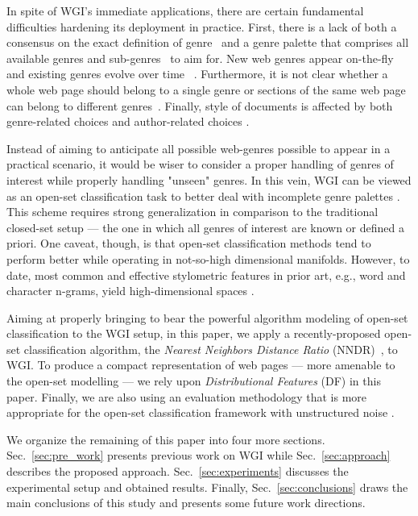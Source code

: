 \documentclass{llncs}
\begin{document}
In spite of WGI's immediate applications, there are certain fundamental difficulties hardening its deployment in practice. First, there is a lack of both a consensus on the exact definition of genre~\cite{crowston2011problems} and a genre palette that comprises all available genres and sub-genres~\cite{santini2011cross,mehler2010genres_on_web,mason2009n,sharoff2010web} to aim for. New web genres appear on-the-fly and existing genres evolve over time~ \cite{Boese2005}. Furthermore, it is not clear whether a whole web page should belong to a single genre or sections of the same web page can belong to different genres~\cite{jebari2015combination,madjarov2015web}. Finally, style of documents is affected by both genre-related choices and author-related choices \cite{petrenz2011stable,sharoff2010web}. 

Instead of aiming to anticipate all possible web-genres possible to appear in a practical scenario, it would be wiser to consider a proper handling of genres of interest while properly handling "unseen" genres. In this vein, 
WGI can be viewed as an open-set classification task to better deal with incomplete genre palettes \cite{Asheghi2015,pritsos2013open,pritsos2018open,pritsos2015clef,stubbe2007genre}. This scheme requires strong generalization in comparison to the traditional closed-set setup --- the one in which all genres of interest are known or defined a priori. One caveat, though, is that open-set classification methods tend to perform better while operating in not-so-high dimensional manifolds. However,  to date, most common and effective stylometric features in prior art, e.g., word and character n-grams, yield  high-dimensional spaces \cite{kanaris2009learning,sharoff2010web}. 

Aiming at properly bringing to bear the powerful algorithm modeling of open-set classification to the WGI setup, 
in this paper, we apply a recently-proposed open-set classification algorithm, the \textit{Nearest Neighbors Distance Ratio} (NNDR)~\cite{mendesjunior2016}, to WGI. To produce a compact representation of web pages --- more amenable to the open-set modelling --- we rely upon  \textit{Distributional Features} (DF) \cite{worsham2018genre} in this paper. Finally, we are also using an evaluation methodology that is more appropriate for the open-set classification framework with unstructured noise \cite{pritsos2018open}. 

We organize the remaining of this paper into four more sections. Sec.~\ref{sec:pre_work} presents previous work on WGI while Sec.~\ref{sec:approach} describes the proposed approach. Sec.~\ref{sec:experiments} discusses the experimental setup and obtained results. Finally, Sec.~\ref{sec:conclusions} draws the main conclusions of this study and presents some future work directions.
\end{document}
